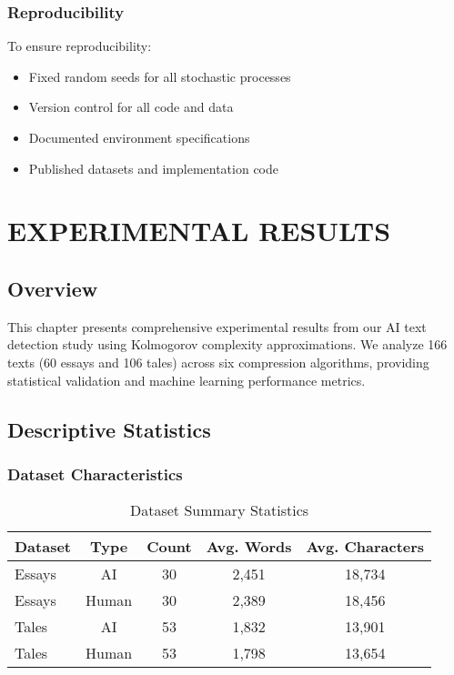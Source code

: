 \documentclass[12pt,a4paper]{report}
\begin{document}
\subsection{Reproducibility}

To ensure reproducibility:
\begin{itemize}
    \item Fixed random seeds for all stochastic processes
    \item Version control for all code and data
    \item Documented environment specifications
    \item Published datasets and implementation code
\end{itemize}

\chapter{EXPERIMENTAL RESULTS}

\section{Overview}

This chapter presents comprehensive experimental results from our AI text detection study using Kolmogorov complexity approximations. We analyze 166 texts (60 essays and 106 tales) across six compression algorithms, providing statistical validation and machine learning performance metrics.

\section{Descriptive Statistics}

\subsection{Dataset Characteristics}

\begin{table}[h]
\centering
\caption{Dataset Summary Statistics}
\begin{tabular}{lcccc}
\toprule
\textbf{Dataset} & \textbf{Type} & \textbf{Count} & \textbf{Avg. Words} & \textbf{Avg. Characters} \\
\midrule
Essays & AI & 30 & 2,451 & 18,734 \\
Essays & Human & 30 & 2,389 & 18,456 \\
Tales & AI & 53 & 1,832 & 13,901 \\
Tales & Human & 53 & 1,798 & 13,654 \\
\bottomrule
\end{tabular}
\end{table}
\end{document}
